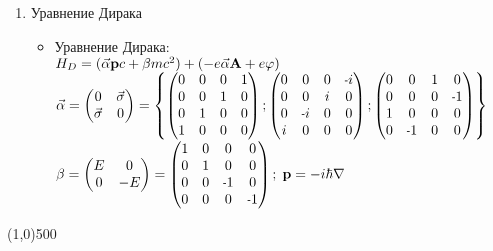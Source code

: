 \begin{enumerate}[label=\textbf{\underline{\arabic*.}}]
\begin{itemize}
        \end{itemize}
\item Уравнение Дирака  \begin{itemize}
            \item Уравнение Дирака: \\
            $ H_D = (\vec{\alpha}\mathbf{p}c+\beta mc^2)+(-e\vec{\alpha}\mathbf{A}+e\varphi) $\\
            $ \vec{\alpha} = \begin{pmatrix} 0 & \vec{\sigma} \\ \vec{\sigma} & 0 \end{pmatrix} =
            \left\{
                \begin{pmatrix}0&0&0&1\\0&0&1&0\\0&1&0&0\\1&0&0&0\end{pmatrix};
                \begin{pmatrix}0&0&0&\scalebox{0.75}[1.0]{-}i\\0&0&i&0\\0&\scalebox{0.75}[1.0]{-}i&0&0\\i&0&0&0\end{pmatrix};
                \begin{pmatrix}0&0&1&0\\0&0&0&\scalebox{0.75}[1.0]{-}1\\1&0&0&0\\0&\scalebox{0.75}[1.0]{-}1&0&0\end{pmatrix}
            \right\} $ \\
            $\beta = \begin{pmatrix} E & 0 \\ 0 & -E \end{pmatrix} =
            \begin{pmatrix}1&0&0&0\\0&1&0&0\\0&0&\scalebox{0.75}[1.0]{-}1&0\\0&0&0&\scalebox{0.75}[1.0]{-}1\end{pmatrix};\;
            \v{p} = -i\hbar\nabla $

        \end{itemize}
\end{enumerate}
\vfill\line(1,0){500}

